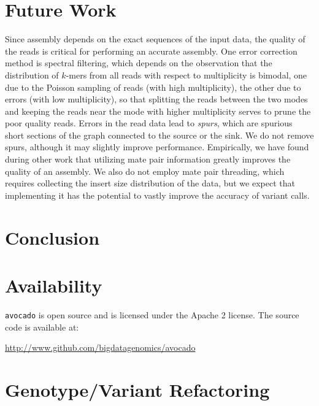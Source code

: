 \documentclass{acm_proc_article-sp}
\begin{document}

\section{Future Work}
\label{sec:future-work}


Since assembly depends on the exact sequences of the input data, the quality of
the reads is critical for performing an accurate assembly.
One error correction method is spectral filtering, which depends on the
observation that the distribution of $k$-mers from all reads with respect to
multiplicity is bimodal, one due to the Poisson sampling of reads (with high
multiplicity), the other due to errors (with low multiplicity), so that splitting
the reads between the two modes and keeping the reads near the mode with higher
multiplicity serves to prune the poor quality reads. %
Errors in the read data lead to \emph{spurs}, which are spurious short sections
of the graph connected to the source or the sink.
We do not remove spurs, although it may slightly improve performance.
Empirically, we have found during other work that utilizing mate pair
information greatly improves the quality of an assembly. %
We also do not employ mate pair threading, which requires collecting the
insert size distribution of the data, but we expect that implementing it has
the potential to vastly improve the accuracy of variant calls.

\section{Conclusion}
\label{sec:conclusion}

\appendix

\section{Availability}
\label{sec:availability}

\texttt{avocado} is open source and is licensed under the Apache 2 license. The source code is available at:

\url{http://www.github.com/bigdatagenomics/avocado}

\section{Genotype/Variant Refactoring}
\label{sec:genotype-variant-refactoring}
\end{document}
